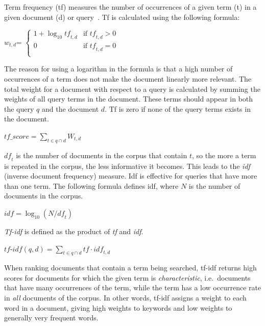 \documentclass{IOS-Book-Article}
\begin{document}
Term frequency (tf) measures the number of occurrences of a given term (t) in a given document (d) or query~\citep{SALTON1988}. 
Tf is calculated using the following formula:
\begin{center} 
	$w_{t,d}$=
	$\begin{cases}
	1+\log_{10} \mathit{tf}_{t,d} & \text{if $\mathit{tf}_{t,d}>0$} \\
	0 & \text{if $\mathit{tf}_{t,d}=0$}\\
	\end{cases}$
\end{center}

The reason for using a logarithm in the formula is that a high number of occurrences of a term does not make the document linearly more relevant.
The total weight for a document with respect to a query is calculated by summing the weights of all query terms in the document.
These terms should appear in both the query $q$ and the document $d$.
Tf is zero if none of the query terms exists in the document.

\begin{center}
	$\mathit{tf\_score}=\sum_{t\in q\cap d} W_{t,d}$
\end{center}

$\mathit{df}_t$ is the number of documents in the corpus that contain $t$, so the more a term is repeated in the corpus, the less informative it becomes.
This leads to the \emph{idf} (inverse document frequency) measure.
Idf is effective for queries that have more than one term.
The following formula defines idf, where $N$ is the number of documents in the corpus.

\begin{center} 
	$\mathit{idf}=\log_{10} (N/\mathit{df}_t)$
\end{center}

\emph{Tf-idf} is defined as the product of \emph{tf} and \emph{idf}. 

\begin{center}
	$\textit{tf-idf}(q,d)=\sum_{t\in q\cap d} \mathit{tf}\cdot\mathit{idf}_{t,d}$
\end{center}

When ranking documents that contain a term being searched, tf-idf returns high scores for documents for which the given term is \emph{characteristic}, i.e.\ documents that have many occurrences of the term, while the term has a low occurrence rate in \emph{all} documents of the corpus.
In other words, tf-idf assigns a weight to each word in a document, giving high weights to keywords and low weights to generally very frequent words.
\end{document}
